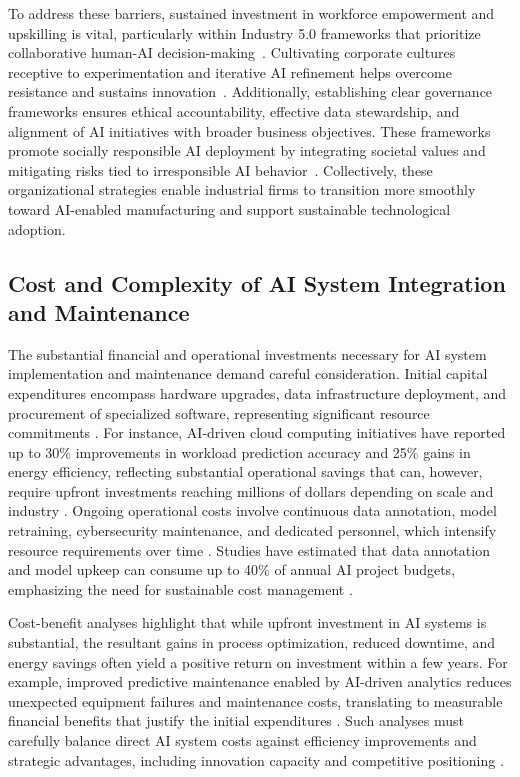 \documentclass[sigconf]{acmart}
\begin{document}
To address these barriers, sustained investment in workforce empowerment and upskilling is vital, particularly within Industry 5.0 frameworks that prioritize collaborative human-AI decision-making~\cite{ref3}. Cultivating corporate cultures receptive to experimentation and iterative AI refinement helps overcome resistance and sustains innovation~\cite{ref26,ref38}. Additionally, establishing clear governance frameworks ensures ethical accountability, effective data stewardship, and alignment of AI initiatives with broader business objectives. These frameworks promote socially responsible AI deployment by integrating societal values and mitigating risks tied to irresponsible AI behavior~\cite{ref26}. Collectively, these organizational strategies enable industrial firms to transition more smoothly toward AI-enabled manufacturing and support sustainable technological adoption.

\subsection{Cost and Complexity of AI System Integration and Maintenance}

The substantial financial and operational investments necessary for AI system implementation and maintenance demand careful consideration. Initial capital expenditures encompass hardware upgrades, data infrastructure deployment, and procurement of specialized software, representing significant resource commitments \cite{ref11,ref12,ref35}. For instance, AI-driven cloud computing initiatives have reported up to 30\% improvements in workload prediction accuracy and 25\% gains in energy efficiency, reflecting substantial operational savings that can, however, require upfront investments reaching millions of dollars depending on scale and industry \cite{ref12}. Ongoing operational costs involve continuous data annotation, model retraining, cybersecurity maintenance, and dedicated personnel, which intensify resource requirements over time \cite{ref7,ref9,ref20}. Studies have estimated that data annotation and model upkeep can consume up to 40\% of annual AI project budgets, emphasizing the need for sustainable cost management \cite{ref7,ref9}.

Cost-benefit analyses highlight that while upfront investment in AI systems is substantial, the resultant gains in process optimization, reduced downtime, and energy savings often yield a positive return on investment within a few years. For example, improved predictive maintenance enabled by AI-driven analytics reduces unexpected equipment failures and maintenance costs, translating to measurable financial benefits that justify the initial expenditures \cite{ref44,ref20}. Such analyses must carefully balance direct AI system costs against efficiency improvements and strategic advantages, including innovation capacity and competitive positioning \cite{ref35}.
\end{document}
